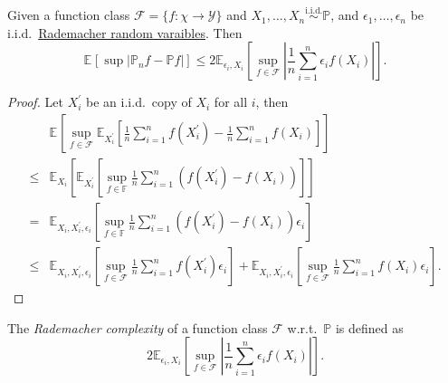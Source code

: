 \begin{lemma}[Symmetrization]\label{lma:symmetrization}
	Given a function class \(\mathscr{F} = \{ f\colon \chi \to \mathcal{Y} \} \) and \(X_1, \dots , X_n \overset{\text{i.i.d.} }{\sim } \mathbb{P} \), and \(\epsilon _1, \dots , \epsilon _n\) be i.i.d.\ \hyperref[eg:Rademacher-random-varaible]{Rademacher random varaibles}. Then
	\[
		\mathbb{E}_{}\left[\sup \left\vert \mathbb{P} _n f - \mathbb{P} f \right\vert  \right]
		\leq 2 \mathbb{E}_{\epsilon _i, X_i}\left[\sup _{f\in \mathscr{F} }\left\vert \frac{1}{n}\sum_{i=1}^{n} \epsilon _i f(X_i) \right\vert  \right] .
	\]
\end{lemma}
\begin{proof}
	Let \(X_i^{\prime} \) be an i.i.d.\ copy of \(X_i\) for all \(i\), then
	\[
		\begin{split}
			&\mathbb{E}_{}\left[\sup _{f\in \mathscr{F} } \mathbb{E}_{X_i^{\prime} }\left[ \frac{1}{n} \sum_{i=1}^{n} f(X_i^{\prime} ) - \frac{1}{n} \sum_{i=1}^{n} f(X_i)\right]  \right]\\
			\leq& \mathbb{E}_{X_i}\left[ \mathbb{E}_{X_i^{\prime} }\left[ \sup _{f\in \mathbb{F} } \frac{1}{n} \sum_{i=1}^{n} (f(X_i^{\prime} ) - f(X_i)) \right]  \right] \\
			=& \mathbb{E}_{X_i, X_i^{\prime} , \epsilon _i}\left[ \sup _{f\in \mathbb{F} } \frac{1}{n} \sum_{i=1}^{n} (f(X_i^{\prime} ) - f(X_i))\epsilon _i \right] \\
			\leq& \mathbb{E}_{X_i, X_i^{\prime} , \epsilon _i}\left[ \sup _{f\in \mathscr{F} } \frac{1}{n}\sum_{i=1}^{n} f(X_i^{\prime} ) \epsilon _i \right] + \mathbb{E}_{X_i, X_i^{\prime} , \epsilon _i}\left[ \sup _{f\in \mathscr{F} } \frac{1}{n}\sum_{i=1}^{n} f(X_i ) \epsilon _i \right].
		\end{split}
	\]
\end{proof}

\begin{definition}\label{def:Rademacher-complexity}
	The \emph{Rademacher complexity} of a function class \(\mathscr{F} \) w.r.t.\ \(\mathbb{P} \) is defined as
	\[
		2 \mathbb{E}_{\epsilon _i, X_i}\left[\sup _{f\in \mathscr{F} }\left\vert \frac{1}{n}\sum_{i=1}^{n} \epsilon _i f(X_i) \right\vert  \right] .
	\]
\end{definition}

